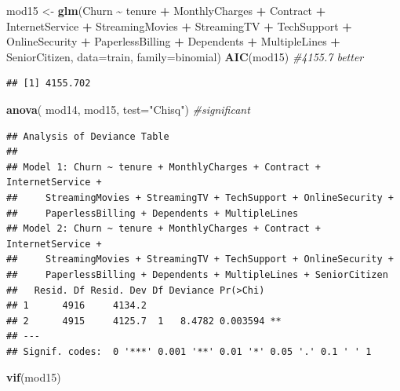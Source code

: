 \documentclass[
  twoside]{article}
\newenvironment{Shaded}{\begin{snugshade}}{\end{snugshade}}
\newcommand{\AttributeTok}[1]{\textcolor[rgb]{0.13,0.29,0.53}{#1}}
\newcommand{\CommentTok}[1]{\textcolor[rgb]{0.56,0.35,0.01}{\textit{#1}}}
\newcommand{\FunctionTok}[1]{\textcolor[rgb]{0.13,0.29,0.53}{\textbf{#1}}}
\newcommand{\NormalTok}[1]{#1}
\newcommand{\OtherTok}[1]{\textcolor[rgb]{0.56,0.35,0.01}{#1}}
\newcommand{\SpecialCharTok}[1]{\textcolor[rgb]{0.81,0.36,0.00}{\textbf{#1}}}
\newcommand{\StringTok}[1]{\textcolor[rgb]{0.31,0.60,0.02}{#1}}
\begin{document}
\begin{Shaded}
\begin{Highlighting}[]
\NormalTok{mod15 }\OtherTok{\textless{}{-}} \FunctionTok{glm}\NormalTok{(Churn }\SpecialCharTok{\textasciitilde{}}\NormalTok{ tenure }\SpecialCharTok{+}\NormalTok{ MonthlyCharges }\SpecialCharTok{+}\NormalTok{ Contract }\SpecialCharTok{+}\NormalTok{ InternetService }\SpecialCharTok{+}
\NormalTok{               StreamingMovies }\SpecialCharTok{+}\NormalTok{ StreamingTV }\SpecialCharTok{+}\NormalTok{ TechSupport }\SpecialCharTok{+}\NormalTok{ OnlineSecurity }\SpecialCharTok{+}
\NormalTok{               PaperlessBilling }\SpecialCharTok{+}\NormalTok{ Dependents }\SpecialCharTok{+}\NormalTok{ MultipleLines }\SpecialCharTok{+}\NormalTok{ SeniorCitizen,}
             \AttributeTok{data=}\NormalTok{train, }\AttributeTok{family=}\NormalTok{binomial)}
\FunctionTok{AIC}\NormalTok{(mod15) }\CommentTok{\#4155.7 better}
\end{Highlighting}
\end{Shaded}

\begin{verbatim}
## [1] 4155.702
\end{verbatim}

\begin{Shaded}
\begin{Highlighting}[]
\FunctionTok{anova}\NormalTok{( mod14, mod15,  }\AttributeTok{test=}\StringTok{"Chisq"}\NormalTok{) }\CommentTok{\#significant}
\end{Highlighting}
\end{Shaded}

\begin{verbatim}
## Analysis of Deviance Table
## 
## Model 1: Churn ~ tenure + MonthlyCharges + Contract + InternetService + 
##     StreamingMovies + StreamingTV + TechSupport + OnlineSecurity + 
##     PaperlessBilling + Dependents + MultipleLines
## Model 2: Churn ~ tenure + MonthlyCharges + Contract + InternetService + 
##     StreamingMovies + StreamingTV + TechSupport + OnlineSecurity + 
##     PaperlessBilling + Dependents + MultipleLines + SeniorCitizen
##   Resid. Df Resid. Dev Df Deviance Pr(>Chi)   
## 1      4916     4134.2                        
## 2      4915     4125.7  1   8.4782 0.003594 **
## ---
## Signif. codes:  0 '***' 0.001 '**' 0.01 '*' 0.05 '.' 0.1 ' ' 1
\end{verbatim}

\begin{Shaded}
\begin{Highlighting}[]
\FunctionTok{vif}\NormalTok{(mod15)}
\end{Highlighting}
\end{Shaded}
\end{document}
